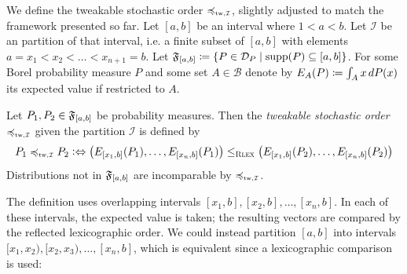 \documentclass[a4paper]{scrreprt}
\newcommand{\B}{\mathcal{B}}
\begin{document}
    
    We define the tweakable stochastic order $\leqtw$, slightly adjusted to match the framework presented so far.
    Let $[a, b]$ be an interval where $1 < a < b$. Let $\mathcal{I}$ be an partition of that interval, i.e. a finite subset of $[a, b]$ with elements $a = x_1 < x_2 < \dots < x_{n+1} = b$.
    Let $\mathfrak{F}_{[a, b]} \coloneqq \{P \in \mathcal{D}_P \mid \operatorname{supp}(P) \subseteq [a, b]\}$.
    For some Borel probability measure $P$ and some set $A \in \B$ denote by $E_A(P) \coloneqq \int_{A} x \, dP(x)$ its expected value if restricted to $A$. 
    \begin{defn}
        \label{def:tweakableStochasticOrder}
        Let $P_1, P_2 \in \mathfrak{F}_{[a, b]}$ be probability measures.
        Then the \emph{tweakable stochastic order} $\leqtw$ given the partition $\mathcal{I}$ is defined by
        \begin{gather*}
            P_1 \leqtw P_2 \colonlra \bigpars{E_{[x_1, b]}(P_{1}), \dots, E_{[x_n, b]}(P_1)} \leqRlex \bigpars{E_{[x_1, b]}(P_2), \dots, E_{[x_n, b]}(P_2)}
        \end{gather*}
        Distributions not in $\mathfrak{F}_{[a, b]}$ are incomparable by $\leqtw$.
    \end{defn}

    The definition uses overlapping intervals $[x_1, b], [x_2, b], \dots, [x_n, b]$. In each of these intervals, the expected value is taken; the resulting vectors are compared by the reflected lexicographic order. We could instead partition $[a, b]$  into intervals $[x_1, x_2), [x_2, x_3), \dots, [x_n, b]$, which is equivalent since a lexicographic comparison is used:
\end{document}
